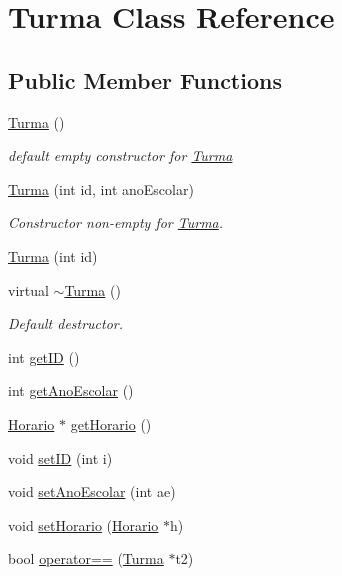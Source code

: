 \hypertarget{class_turma}{\section{Turma Class Reference}
\label{class_turma}
}
\subsection*{Public Member Functions}
\begin{DoxyCompactItemize}
\item 
\hypertarget{class_turma_a8ad1feec07b4c0ff5d4ec51c8b4a61fd}{\hyperlink{class_turma_a8ad1feec07b4c0ff5d4ec51c8b4a61fd}{Turma} ()}\label{class_turma_a8ad1feec07b4c0ff5d4ec51c8b4a61fd}

\begin{DoxyCompactList}\small\item\em default empty constructor for \hyperlink{class_turma}{Turma} \end{DoxyCompactList}\item 
\hyperlink{class_turma_a6a392c8d9e5b824ce0460740c9bfcdc9}{Turma} (int id, int ano\-Escolar)
\begin{DoxyCompactList}\small\item\em Constructor non-\/empty for \hyperlink{class_turma}{Turma}. \end{DoxyCompactList}\item 
\hyperlink{class_turma_a68d82f9338997281af20221fff43b509}{Turma} (int id)
\item 
\hypertarget{class_turma_ac9901558278461593150226ed06567e2}{virtual \hyperlink{class_turma_ac9901558278461593150226ed06567e2}{$\sim$\-Turma} ()}\label{class_turma_ac9901558278461593150226ed06567e2}

\begin{DoxyCompactList}\small\item\em Default destructor. \end{DoxyCompactList}\item 
int \hyperlink{class_turma_a25bc31537a7fb3345712b780ff2f825f}{get\-I\-D} ()
\item 
int \hyperlink{class_turma_a18af6d19b01102c00f07720f7b149252}{get\-Ano\-Escolar} ()
\item 
\hyperlink{class_horario}{Horario} $\ast$ \hyperlink{class_turma_af23a78e8b0130542d662f9d1c20b9422}{get\-Horario} ()
\item 
void \hyperlink{class_turma_a5c011a25251cd40d549e504b71d7b18f}{set\-I\-D} (int i)
\item 
void \hyperlink{class_turma_abd1be35d1d394aeca1818ed643845ff8}{set\-Ano\-Escolar} (int ae)
\item 
void \hyperlink{class_turma_aab28fe642d927ba176ec4259fdc2d8e0}{set\-Horario} (\hyperlink{class_horario}{Horario} $\ast$h)
\item 
bool \hyperlink{class_turma_a52d07a750b962cfb81c2067858d9d08a}{operator==} (\hyperlink{class_turma}{Turma} $\ast$t2)
\end{DoxyCompactItemize}


